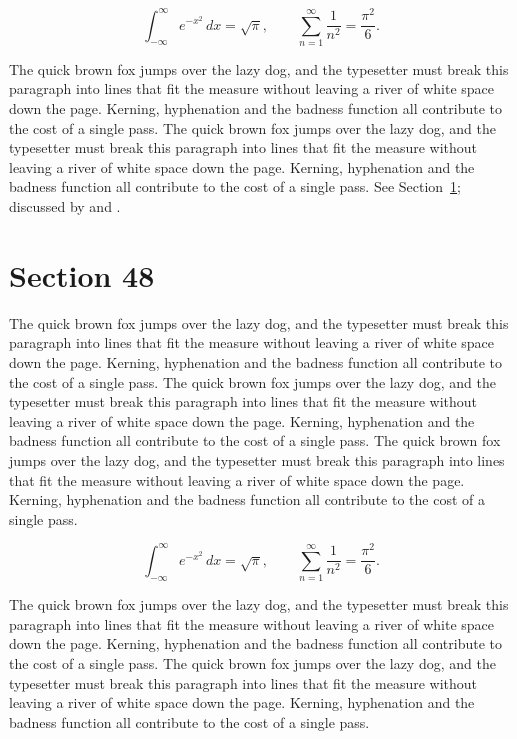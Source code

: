 \documentclass{article}
\begin{document}
\begin{equation}\label{eq:47}
\int_{-\infty}^{\infty} e^{-x^{2}}\,dx = \sqrt{\pi}, \qquad
\sum_{n=1}^{\infty} \frac{1}{n^{2}} = \frac{\pi^{2}}{6}.
\end{equation}

The quick brown fox jumps over the lazy dog, and the typesetter must break this paragraph into lines that fit the measure without leaving a river of white space down the page. Kerning, hyphenation and the badness function all contribute to the cost of a single pass. The quick brown fox jumps over the lazy dog, and the typesetter must break this paragraph into lines that fit the measure without leaving a river of white space down the page. Kerning, hyphenation and the badness function all contribute to the cost of a single pass. 
See Section~\ref{sec:48}; discussed by \textcite{k3} and \textcite{l5}.
\section{Section 48}
\label{sec:48}
The quick brown fox jumps over the lazy dog, and the typesetter must break this paragraph into lines that fit the measure without leaving a river of white space down the page. Kerning, hyphenation and the badness function all contribute to the cost of a single pass. The quick brown fox jumps over the lazy dog, and the typesetter must break this paragraph into lines that fit the measure without leaving a river of white space down the page. Kerning, hyphenation and the badness function all contribute to the cost of a single pass. The quick brown fox jumps over the lazy dog, and the typesetter must break this paragraph into lines that fit the measure without leaving a river of white space down the page. Kerning, hyphenation and the badness function all contribute to the cost of a single pass. 

\begin{equation}\label{eq:48}
\int_{-\infty}^{\infty} e^{-x^{2}}\,dx = \sqrt{\pi}, \qquad
\sum_{n=1}^{\infty} \frac{1}{n^{2}} = \frac{\pi^{2}}{6}.
\end{equation}

The quick brown fox jumps over the lazy dog, and the typesetter must break this paragraph into lines that fit the measure without leaving a river of white space down the page. Kerning, hyphenation and the badness function all contribute to the cost of a single pass. The quick brown fox jumps over the lazy dog, and the typesetter must break this paragraph into lines that fit the measure without leaving a river of white space down the page. Kerning, hyphenation and the badness function all contribute to the cost of a single pass. 
\end{document}
